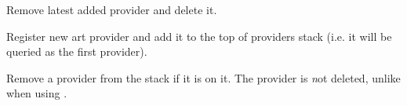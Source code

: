 
Remove latest added provider and delete it.


\label{wxartproviderpush}


Register new art provider and add it to the top of providers stack (i.e. it
will be queried as the first provider).




\label{wxartproviderremove}


Remove a provider from the stack if it is on it. The provider is {\emph not} 
deleted, unlike when using .

